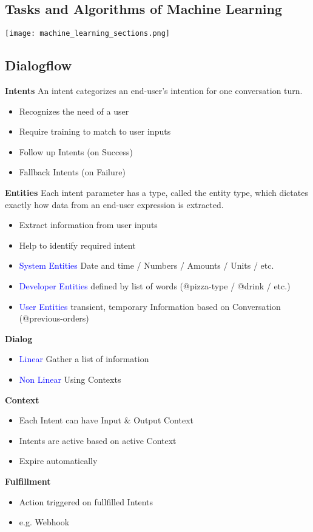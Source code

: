 \subsection{Tasks and Algorithms of Machine Learning}
\texttt{[image: machine\_learning\_sections.png]}

\subsection{Dialogflow}
\textbf{Intents}
An intent categorizes an end-user's intention for one conversation turn.
\begin{itemize}
    \item Recognizes the need of a user
    \item Require training to match to user inputs
    \item Follow up Intents (on Success)
    \item Fallback Intents (on Failure)
\end{itemize}
\textbf{Entities}
Each intent parameter has a type, called the entity type, which dictates exactly how data from an end-user expression is extracted.
\begin{itemize}
    \item Extract information from user inputs
    \item Help to identify required intent
    \item \textcolor{blue}{System Entities} Date and time / Numbers / Amounts / Units / etc.
    \item \textcolor{blue}{Developer Entities} defined by list of words (@pizza-type / @drink / etc.)
    \item \textcolor{blue}{User Entities} transient, temporary Information based on Conversation (@previous-orders)
\end{itemize}
\textbf{Dialog}
\begin{itemize}
    \item \textcolor{blue}{Linear} Gather a list of information
    \item \textcolor{blue}{Non Linear} Using Contexts
\end{itemize}
\textbf{Context}
\begin{itemize}
    \item Each Intent can have Input \& Output Context
    \item Intents are active based on active Context
    \item Expire automatically
\end{itemize}
\textbf{Fulfillment}
\begin{itemize}
    \item Action triggered on fullfilled Intents
    \item e.g. Webhook
\end{itemize}

